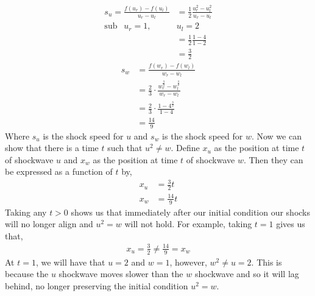 \begin{solution}[\textbf{2}]
\begin{align*}
    s_u = \frac{f(u_r) - f(u_l)}{u_r - u_l} &= \frac{1}{2}\frac{u_r^2 - u_l^2}{u_r - u_l} \\
    \text{sub } \ \ u_r = 1, \  &u_l = 2 \\
                                &= \frac{1}{2} \frac{1 - 4}{1 - 2} \\
                                &= \frac{3}{2}
\end{align*}
\begin{align*}
    s_w &= \frac{f(w_r) - f(w_l)}{w_r - w_l} \\
        &= \frac{2}{3} \cdot \frac{w_r^{\frac{3}{2}} - w_l^{\frac{3}{2}}}{w_r - w_l} \\
        &= \frac{2}{3} \cdot \frac{1 - 4^{\frac{3}{2}}}{1 - 4}\\
        &= \frac{14}{9}
\end{align*}
Where $s_u$ is the shock speed for $u$ and $s_w$ is the shock speed for $w$. Now we can show that there is a time $t$ such that $u^2 \neq w$. Define $x_u$ as the position at time $t$ of shockwave $u$ and $x_w$ as the position at time $t$ of shockwave $w$. Then they can be expressed as a function of $t$ by,
\begin{align*}
x_u &= \frac{3}{2} t \\
x_w &= \frac{14}{9} t
\end{align*}
Taking any $t > 0$ shows us that immediately after our initial condition our shocks will no longer align and $u^2 = w$ will not hold. For example, taking $t = 1$ gives us that,
\begin{align*}
x_u = \frac{3}{2} \neq \frac{14}{9} = x_w
\end{align*}
At $t = 1$, we will have that $u = 2$ and $w = 1$, however, $w^2 \neq u = 2$. This is because the $u$ shockwave moves slower than the $w$ shockwave and so it will lag behind, no longer preserving the initial condition $u^2 = w$.
\end{solution}

